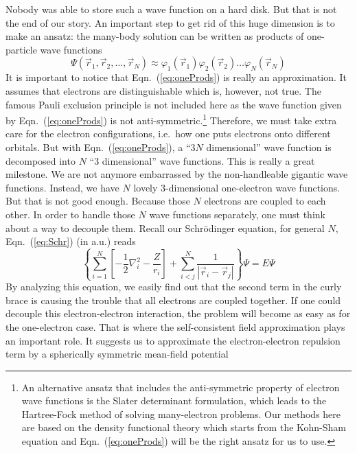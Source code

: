 Nobody was able to store such a wave function on a hard disk. But that is not
the end of our story. An important step to get rid of this huge dimension
is to make an ansatz: the many-body solution can be written as products of
one-particle wave functions
\begin{equation} \label{eq:oneProds}
\Psi(\vec{r}_1,\vec{r}_2,\ldots,\vec{r}_N) \approx \varphi_1(\vec{r}_1)\varphi_2(\vec{r}_2)\ldots\varphi_N(\vec{r}_N)
\end{equation}
It is important to notice that Eqn.~(\ref{eq:oneProds}) is really an approximation.
It assumes that electrons are distinguishable which is, however, not true.
The famous Pauli exclusion principle is not included here as the wave function
given by Eqn.~(\ref{eq:oneProds}) is not anti-symmetric.\footnote{An alternative
ansatz that includes the anti-symmetric property of electron wave functions
is the Slater determinant formulation, which leads to the Hartree-Fock method
of solving many-electron problems. Our methods here are based on the density
functional theory which starts from the Kohn-Sham equation and
Eqn.~(\ref{eq:oneProds}) will be the right ansatz for us to use.}
Therefore, we must take extra care for the electron configurations, i.e.\
how one puts electrons onto different orbitals. But with Eqn.~(\ref{eq:oneProds}),
a ``$3N$ dimensional'' wave function is decomposed into $N$ ``3 dimensional''
wave functions. This is really a great milestone. We are
not anymore embarrassed by the non-handleable gigantic wave functions. Instead,
we have $N$ lovely 3-dimensional one-electron wave functions. But that is not
good enough. Because those $N$ electrons are coupled to each other. In order to handle
those $N$ wave functions separately, one must think about a way to decouple them.
Recall our Schr\"{o}dinger equation, for general $N$, Eqn.~(\ref{eq:Schr}) (in a.u.) reads
\begin{equation} \label{eq:SchrMany}
\left\{\sum_{i=1}^N \left[ -\frac{1}{2} \nabla_i^2 - \frac{Z}{r_i} \right] + \sum_{i<j}^N \frac{1}{|\vec{r}_i - \vec{r}_j|}\right\} \Psi = E \Psi
\end{equation}
By analyzing this equation, we easily find out that the second term in the curly
brace is causing the trouble that all electrons are coupled together.
If one could decouple this electron-electron interaction, the problem will
become as easy as for the one-electron case. That is where the self-consistent
field approximation plays an important role. It suggests us to approximate the
electron-electron repulsion term by a spherically symmetric mean-field potential
